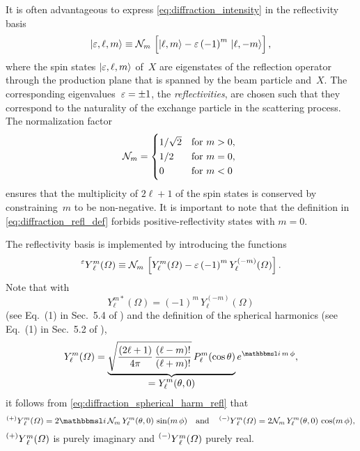 It is often advantageous to express \cref{eq:diffraction_intensity} in
the reflectivity basis
\begin{equation}
  \label{eq:diffraction_refl_def}
  \ket{\refl, \ell, m}
  \equiv \mathcal{N}_m\, \sBrk[2]{\ket{\ell, m} - \refl\, {(-1)}^m\, \ket{\ell, {-m}}},
\end{equation}
where the spin states $\ket{\varepsilon, \ell, m}$ of~$X$ are eigenstates of
the reflection operator through the production plane that is spanned
by the beam particle and~$X$.  The corresponding eigenvalues~$\varepsilon =
\pm 1$, the \emph{reflectivities}, are chosen such that they
correspond to the naturality of the exchange particle in the
scattering process.  The normalization factor
\begin{equation}
  \label{eq:refl_norm}
  \mathcal{N}_m
  = \begin{cases*}
      1 / \sqrt{2} & for $m > 0$, \\
      1 / 2        & for $m = 0$, \\
      0            & for $m < 0$
    \end{cases*}
\end{equation}
ensures that the multiplicity of $2 \ell + 1$ of the spin states is
conserved by constraining~$m$ to be non-negative.  It is important to
note that the definition in \cref{eq:diffraction_refl_def} forbids
positive-reflectivity states with $m = 0$.

The reflectivity basis is implemented by introducing the functions
\begin{equation}
  \label{eq:diffraction_spherical_harm_refl}
  \prescript{\refl}{}{Y}_\ell^m(\Omega)
  \equiv \mathcal{N}_m\, \sBrk[2]{Y_\ell^m(\Omega) - \refl\, {(-1)}^m\, Y_\ell^{(-m)}(\Omega)}.
\end{equation}
Note that with
\begin{equation}
  \label{eq:spherical_harm_sym}
  Y_\ell^{m *}(\Omega)
  = {(-1)}^m\, Y_\ell^{(-m)}(\Omega)
\end{equation}
(see Eq.~(1) in Sec.~5.4 of ) and the
definition of the spherical harmonics (see Eq.~(1) in Sec.~5.2 of
),
\begin{equation}
  \label{eq:sspherical_harm_def}
  Y_\ell^m(\Omega)
  = \dUnderbrace{\sqrt{\frac{(2 \ell + 1)}{4 \pi}\, \frac{(\ell -m)!}{(\ell + m)!}}\, P_\ell^m(\cos\theta)}{= Y_\ell^m(\theta, 0)}\, e^{\imag\, m\, \phi},
\end{equation}
it follows
from \cref{eq:diffraction_spherical_harm_refl} that
\begin{equation}
  \prescript{(+)}{}{Y}_\ell^m(\Omega)
  = 2 \imag\, \mathcal{N}_m\, Y_\ell^m(\theta, 0)\, \sin(m\, \phi)
  \quad\text{and}\quad
  \prescript{(-)}{}{Y}_\ell^m(\Omega)
  = 2 \mathcal{N}_m\, Y_\ell^m(\theta, 0)\, \cos(m\, \phi),
\end{equation}
\ie $\prescript{(+)}{}{Y}_\ell^m(\Omega)$ is purely imaginary and
$\prescript{(-)}{}{Y}_\ell^m(\Omega)$ purely real.

